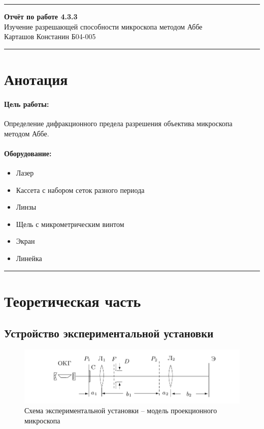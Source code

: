 \documentclass[a4paper,12pt]{article} %
\begin{document}


\hrule 	
\medskip
\begin{raggedright}
{\large \textbf{Отчёт по работе 4.3.3}}
\\
\medskip
{\Large Изучение разрешающей способности микроскопа методом Аббе} 
\\
\medskip
{\large Карташов Констанин Б04-005}
\medskip
\hrule
\medskip
\end{raggedright}


\section{Анотация}

\paragraph{Цель работы:} 
Определение дифракционного предела разрешения объектива микроскопа методом Аббе.

\paragraph{Оборудование:}
\begin{itemize}
\renewcommand{\labelitemi}{$\triangleright$}
\itemsep0em
\item Лазер
\item Кассета с набором сеток разного периода
\item Линзы
\item Щель с микрометрическим винтом
\item Экран
\item Линейка
\end{itemize}


\medskip\hrule\medskip
\FloatBarrier

\section{Теоретическая часть}

\subsection{Устройство экспериментальной установки}

\begin{figure}
\centering
\includegraphics[width=\textwidth]{setup.png}
\caption{Схема экспериментальной установки -- модель проекционного микроскопа}
\label{fig:setup}
\end{figure}
\end{document}
